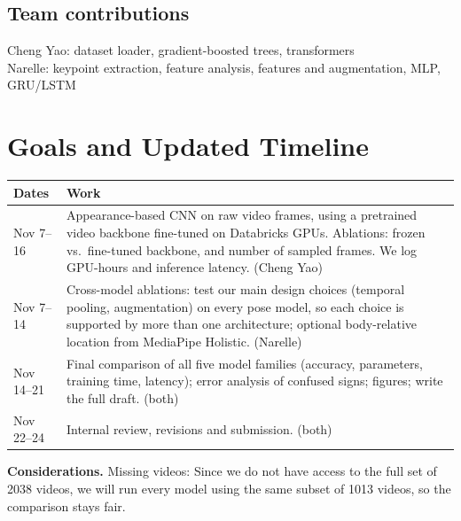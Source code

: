 \documentclass[10pt]{article}
\begin{document}
\subsection{Team contributions}
Cheng Yao: dataset loader, gradient-boosted trees, transformers \\
Narelle: keypoint extraction, feature analysis, features and augmentation, MLP, GRU/LSTM

\section{Goals and Updated Timeline}\label{sec:goals}
\begin{center}\footnotesize
\begin{tabular}{p{2.1cm}p{14cm}}
\toprule
Dates & Work \\
\midrule
Nov 7--16 & Appearance-based CNN on raw video frames, using a pretrained video backbone fine-tuned on Databricks
            GPUs. Ablations: frozen vs.\ fine-tuned backbone, and number of sampled frames. We log GPU-hours and
            inference latency. (Cheng Yao) \\
Nov 7--14 & Cross-model ablations: test our main design choices (temporal pooling, augmentation) on every pose
            model, so each choice is supported by more than one architecture; optional body-relative location from
            MediaPipe Holistic. (Narelle) \\
Nov 14--21 & Final comparison of all five model families (accuracy, parameters, training time, latency); error
             analysis of confused signs; figures; write the full draft. (both) \\
Nov 22--24 & Internal review, revisions and submission. (both) \\
\bottomrule
\end{tabular}
\end{center}

\textbf{Considerations.} Missing videos: Since we do not have access to the full set of 2038 videos, we will run every model using the same subset of 1013 videos, so the comparison stays fair.
\end{document}
